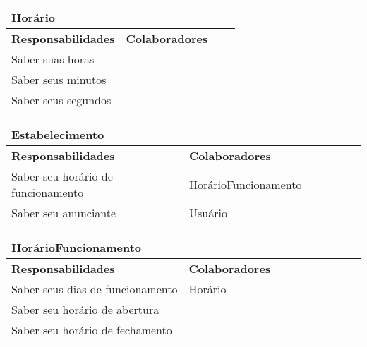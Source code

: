 \documentclass{article}
\begin{document}
    
    \begin{center}
   	 \begin{tabular}{|p{0.5\linewidth}|p{0.5\linewidth}|}
\hline
 	\multicolumn{2}{|p{\textwidth}|}{
{\large \textbf{Horário}}
}  \\
\hline
\textbf{Responsabilidades} & \textbf{Colaboradores} \\ 
\hline
  	Saber suas horas &  \\
  	\hline
  	Saber seus minutos &  \\
  	\hline
  	Saber seus segundos &  \\
  	\hline
   	\end{tabular} 
    \end{center}
    
    
    \begin{center}
   	 \begin{tabular}{|p{0.5\linewidth}|p{0.5\linewidth}|}
\hline
 	\multicolumn{2}{|p{\textwidth}|}{
{\large \textbf{Estabelecimento}}
}  \\
\hline
\textbf{Responsabilidades} & \textbf{Colaboradores} \\ 
\hline
  	Saber seu horário de funcionamento &  HorárioFuncionamento \\
  	\hline
  	Saber seu anunciante & Usuário \\
  	\hline
   	\end{tabular} 
    \end{center}
    
    
    \begin{center}
   	 \begin{tabular}{|p{0.5\linewidth}|p{0.5\linewidth}|}
\hline
 	\multicolumn{2}{|p{\textwidth}|}{
{\large \textbf{HorárioFuncionamento}}
}  \\
\hline
\textbf{Responsabilidades} & \textbf{Colaboradores} \\ 
\hline
  	Saber seus dias de funcionamento & Horário \\
  	\hline
  	Saber seu horário de abertura &  \\
  	\hline
  	Saber seu horário de fechamento &  \\
  	\hline
   	\end{tabular} 
    \end{center}
    
\end{document}
